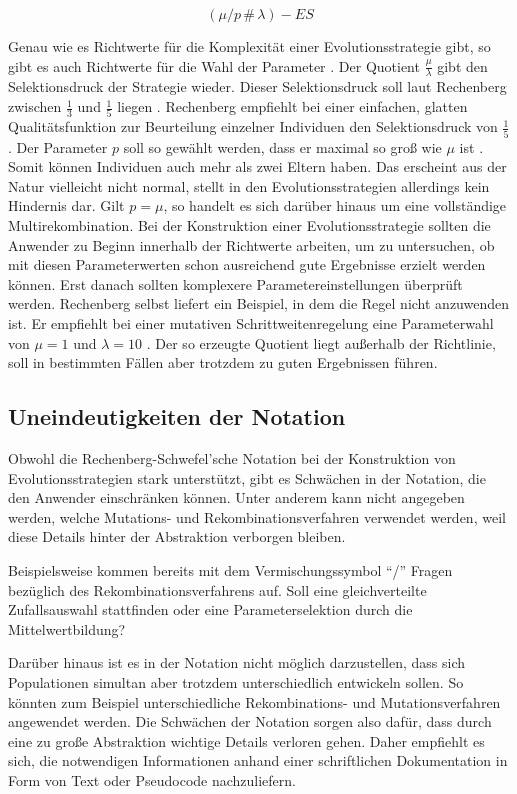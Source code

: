\begin{equation}
\label{eqn:opt_parameter}
(\mu/p\,\#\,\lambda)-ES
\end{equation}

Genau wie es Richtwerte für die Komplexität einer Evolutionsstrategie gibt, so gibt es auch Richtwerte für die Wahl der Parameter \cite[S.~166]{schoeneburg}.
Der Quotient $\frac{\mu}{\lambda}$ gibt den Selektionsdruck der Strategie wieder. Dieser Selektionsdruck soll laut Rechenberg zwischen $\frac{1}{3}$ und $\frac{1}{5}$ liegen  \cite[S.~166]{schoeneburg}. Rechenberg empfiehlt bei einer einfachen, glatten Qualitätsfunktion zur Beurteilung einzelner Individuen den Selektionsdruck von $\frac{1}{5}$  \cite[S.~166]{schoeneburg}.
Der Parameter $p$ soll so gewählt werden, dass er maximal so groß wie $\mu$ ist \cite[S.~166]{schoeneburg}. Somit können Individuen auch mehr als zwei Eltern haben. Das erscheint aus der Natur vielleicht nicht normal, stellt in den Evolutionsstrategien allerdings kein Hindernis dar. Gilt $p = \mu$, so handelt es sich darüber hinaus um eine vollständige Multirekombination.
Bei der Konstruktion einer Evolutionsstrategie sollten die Anwender zu Beginn innerhalb der Richtwerte arbeiten, um zu untersuchen, ob mit diesen Parameterwerten schon ausreichend gute Ergebnisse erzielt werden können. Erst danach sollten komplexere Parametereinstellungen überprüft werden.
Rechenberg selbst liefert ein Beispiel, in dem die Regel nicht anzuwenden ist. Er empfiehlt bei einer mutativen Schrittweitenregelung eine Parameterwahl von $\mu = 1$ und $\lambda = 10$ \cite[S.~166]{schoeneburg}. Der so erzeugte Quotient liegt außerhalb der Richtlinie, soll in bestimmten Fällen aber trotzdem zu guten Ergebnissen führen.

\subsection{Uneindeutigkeiten der Notation}

Obwohl die Rechenberg-Schwefel'sche Notation bei der Konstruktion von Evolutionsstrategien stark unterstützt, gibt es Schwächen in der Notation, die den Anwender einschränken können.
Unter anderem kann nicht angegeben werden, welche Mutations- und Rekombinationsverfahren verwendet werden, weil diese Details hinter der Abstraktion verborgen bleiben.

Beispielsweise kommen bereits mit dem Vermischungssymbol \enquote{/} Fragen bezüglich des Rekombinationsverfahrens auf.
Soll eine gleichverteilte Zufallsauswahl stattfinden oder eine Parameterselektion durch die Mittelwertbildung?

Darüber hinaus ist es in der Notation nicht möglich darzustellen, dass sich Populationen simultan aber trotzdem unterschiedlich entwickeln sollen. So könnten zum Beispiel unterschiedliche Rekombinations- und Mutationsverfahren angewendet werden.
Die Schwächen der Notation sorgen also dafür, dass durch eine zu große Abstraktion wichtige Details verloren gehen. 
Daher empfiehlt es sich, die notwendigen Informationen anhand einer schriftlichen Dokumentation in Form von Text oder Pseudocode nachzuliefern.
